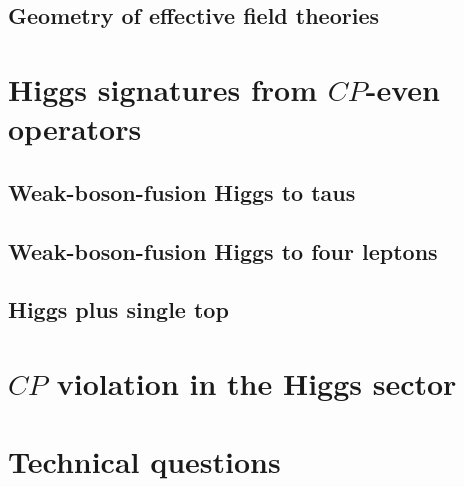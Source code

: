 \subsection{Geometry of effective field theories}


\section{Higgs signatures from $CP$-even operators}
\label{sec:information_application}

\subsection{Weak-boson-fusion Higgs to taus}
\label{sec:information_wbf_taus}

\subsection{Weak-boson-fusion Higgs to four leptons}
\label{sec:information_wbf_4l}

\subsection{Higgs plus single top}
\label{sec:information_th}


\section{$CP$ violation in the Higgs sector}
\label{sec:information_CPV}




\section{Technical questions}
\label{sec:information_extensions}

